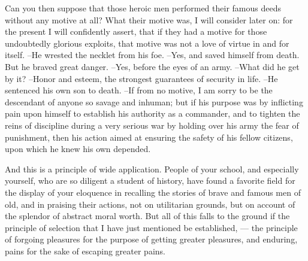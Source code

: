 {Can you then suppose that those heroic men performed their famous deeds without any motive at all? What their motive was, I will consider later on: for the present I will confidently assert, that if they had a motive for those undoubtedly glorious exploits, that motive was not a love of virtue in and for itself.
--He wrested the necklet from his foe.
--Yes, and saved himself from death. But he braved great danger.
--Yes, before the eyes of an army.
--What did he get by it?
--Honor and esteem, the strongest guarantees of security in life.
--He sentenced his own son to death.
--If from no motive, I am sorry to be the descendant of anyone so savage and inhuman; but if his purpose was by inflicting pain upon himself to establish his authority as a commander, and to tighten the reins of discipline during a very serious war by holding over his army the fear of punishment, then his action aimed at ensuring the safety of his fellow citizens, upon which he knew his own depended.

And this is a principle of wide application. People of your school, and especially yourself, who are so diligent a student of history, have found a favorite field for the display of your eloquence in recalling the stories of brave and famous men of old, and in praising their actions, not on utilitarian grounds, but on account of the splendor of abstract moral worth. But all of this falls to the ground if the principle of selection that I have just mentioned be established, --- the principle of forgoing pleasures for the purpose of getting greater pleasures, and enduring, pains for the sake of escaping greater pains.


}
